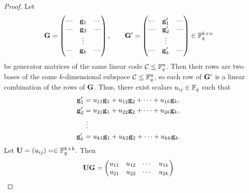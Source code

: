 \begin{proof}
	Let
\[
\mathbf{G}=\begin{pmatrix}
	\text{---} & \mathbf{g}_1 & \text{---}\\
	\text{---} & \mathbf{g}_2 & \text{---}\\
	& \vdots & \\
	\text{---} & \mathbf{g}_k & \text{---}
\end{pmatrix},
\qquad
\mathbf{G}'=\begin{pmatrix}
	\text{---} & \mathbf{g}_1' & \text{---}\\
	\text{---} & \mathbf{g}_2' & \text{---}\\
	& \vdots & \\
	\text{---} & \mathbf{g}_k' & \text{---}
\end{pmatrix}
\in \mathbb{F}_q^{k\times n}
\] be generator matrices of the same linear code \(\mathcal{C}\leq \mathbb{F}_q^n\). 
Then their rows are two bases of the same \(k\)-dimensional subspace \(\mathcal{C}\leq \mathbb{F}_q^n\), so each row of \(\mathbf{G}'\) is a linear combination of the rows of \(\mathbf{G}\). Thus, there exist scalars \(u_{ij}\in\mathbb{F}_q\) such that \begin{align*}
	\mathbf{g}_1'&=u_{11}\mathbf{g}_1+u_{12}\mathbf{g}_2+\cdots+u_{1k}\mathbf{g}_k,\\
	\mathbf{g}_2'&=u_{21}\mathbf{g}_1+u_{22}\mathbf{g}_2+\cdots+u_{2k}\mathbf{g}_k,\\
	&\ \vdots\\
	\mathbf{g}_k'&=u_{k1}\mathbf{g}_1+u_{k2}\mathbf{g}_2+\cdots+u_{kk}\mathbf{g}_k.
\end{align*}
Let $
\mathbf{U}=(u_{ij})=
\in \mathbb{F}_q^{k\times k}.
$ Then
\[
\mathbf{U}\mathbf{G}=
\begin{pmatrix}
	u_{11}&u_{12}&\cdots&u_{1k}\\
	u_{21}&u_{22}&\cdots&u_{2k}\\

\end{pmatrix}\]
\end{proof}
